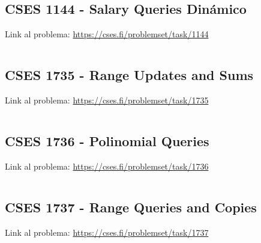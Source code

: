 \documentclass{article}
\begin{document}
\subsection{CSES 1144 - Salary Queries Dinámico}
Link al problema: \href{https://cses.fi/problemset/task/1144}{https://cses.fi/problemset/task/1144}
\inputminted{c++}{Problemas/5Dinamico.cpp}

\subsection{CSES 1735 - Range Updates and Sums}
Link al problema: \href{https://cses.fi/problemset/task/1735}{https://cses.fi/problemset/task/1735}
\inputminted{c++}{Problemas/6.cpp}

\subsection{CSES 1736 - Polinomial Queries}
Link al problema: \href{https://cses.fi/problemset/task/1736}{https://cses.fi/problemset/task/1736}
\inputminted{c++}{Problemas/7.cpp}

\subsection{CSES 1737 - Range Queries and Copies}
Link al problema: \href{https://cses.fi/problemset/task/1737}{https://cses.fi/problemset/task/1737}
\inputminted{c++}{Problemas/8.cpp}
\end{document}
